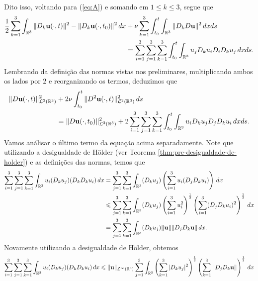 \begin{prf}
\[\begin{aligned}
        \end{aligned}
    \]
    Dito isso, voltando para (\ref{eq:A}) e somando em $1 \leqslant k \leqslant 3$, segue que
    \[
        \begin{aligned}
            \frac{1}{2} \sum_{k=1}^3 \int_{\mathbb{R}^3} \Vert D_k \mathbf{u}(\cdot,t) \Vert^2 - \Vert D_k \mathbf{u}(\cdot,t_0) \Vert^2 \,dx  &+ \nu \sum_{k=1}^3 \int_{t_0}^t \int_{\mathbb{R}^3} \Vert D_kD\mathbf{u} \Vert^2 \,dx ds\\
        &= \sum_{i=1}^3 \sum_{j=1}^3\sum_{k=1}^3 \int_{t_0}^{t}\int_{\mathbb{R}^3} u_j D_k u_i D_i D_k u_j \,dxds.
        \end{aligned}
    \]
    Lembrando da definição das normas vistas nos preliminares, multiplicando ambos os lados por $2$ e reorganizando os termos, deduzimos que
    \begin{equation} \label{eq:y2}
        \begin{aligned}
            \Vert D\mathbf{u}(\cdot,t) \Vert_{\mathcal{L}^2(\mathbb{R}^3)}^2 &+ 2\nu \int_{t_0}^t \Vert D^2 \mathbf{u}(\cdot,t) \Vert_{\mathcal{L}^2(\mathbb{R}^3)}^2 \,ds\\ &= \Vert D\mathbf{u}(\cdot,t_0) \Vert_{\mathcal{L}^2(\mathbb{R}^3)}^2 + 2 \sum_{i=1}^3 \sum_{j=1}^3\sum_{k=1}^3 \int_{t_0}^t \int_{\mathbb{R}^3} u_i D_k u_j D_j D_k u_i \,dxds.
        \end{aligned}
    \end{equation}
    Vamos análisar o último termo da equação acima separadamente.
    Note que utilizando a desigualdade de Hölder (ver Teorema \ref{thm:pre-desigualdade-de-holder}) e as definições das normas, temos que
    \[
        \begin{aligned}
            \sum_{i=1}^3\sum_{j=1}^3\sum_{k=1}^3 \int_{\mathbb{R}^3} u_i (D_k u_j)(D_k D_k u_i)\,dx &= \sum_{j=1}^3 \sum_{k=1}^3 \int_{\mathbb{R}^3} (D_k u_j) \left( \sum_{i=1}^3 u_i (D_j D_k u_i) \right) \,dx\\
            &\leqslant \sum_{j=1}^3 \sum_{k=1}^{3} \int_{\mathbb{R}^3} (D_k u_j) \left( \sum_{i=1}^3 u_i^2      \right)^{\frac{1}{2}} \left( \sum_{i=1}^3 (D_j D_k u_i)^2 \right)^{\frac{1}{2}} \,dx\\
            &=\sum_{j=1}^3\sum_{k=1}^{3} \int_{\mathbb{R}^3} (D_k u_j) \Vert \mathbf{u} \Vert \Vert D_j D_k \mathbf{u} \Vert \,dx.
        \end{aligned}
    \]
    Novamente utilizando a desigualdade de Hölder, obtemos
    \[
        \begin{aligned}
            \sum_{i=1}^3\sum_{j=1}^3\sum_{k=1}^3 \int_{\bR^3} u_i (D_k u_j)(D_k D_k u_i)\,dx
            &\leqslant \Vert \bu \Vert_{\cL^\infty(\bR^3)} \sum_{j=1}^3 \int_{\bR^3} \left( \sum_{k=1}^3 |D_k u_j|^2 \right)^{\frac{1}{2}} \left( \sum_{k=1}^3 \Vert D_j D_k \bu \Vert \right)^{\frac{1}{2}} \,dx\\

\end{aligned}\]
\end{prf}
